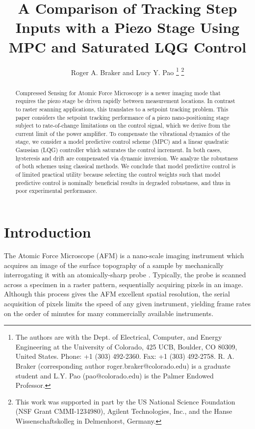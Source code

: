\documentclass[twocolumn,twoside]{IEEEtran}
\begin{document}
\title{A Comparison of Tracking Step Inputs with a Piezo Stage Using MPC and Saturated LQG Control}
\author{Roger A. Braker and Lucy Y. Pao
  \thanks{The authors are with the Dept. of Electrical, Computer, and Energy Engineering at the University of Colorado, 425 UCB, Boulder, CO 80309, United States. Phone: +1 (303) 492-2360. Fax: +1 (303) 492-2758.
    R. A.  Braker (corresponding author roger.braker@colorado.edu) is a graduate student and
    L.Y. Pao (pao@colorado.edu) is the Palmer Endowed Professor.}
  \thanks{This work was supported in part by the US National Science Foundation (NSF Grant CMMI-1234980), Agilent Technologies, Inc., and the Hanse Wissenschaftskolleg in Delmenhorst, Germany.}
}

\maketitle
\begin{abstract}
  Compressed Sensing for Atomic Force Microscopy is a newer imaging mode that requires the piezo stage be driven rapidly between measurement locations. In contrast to raster scanning applications, this translates to a setpoint tracking problem. 
  This paper considers the setpoint tracking performance of a piezo nano-positioning stage subject to rate-of-change limitations on the control signal, which we derive from the current limit of the power amplifier.
To compensate the vibrational dynamics of the stage, we consider a model predictive control scheme (MPC) and a linear quadratic Gaussian (LQG) controller which saturates the control increment. In both cases, hysteresis and drift are compensated via dynamic inversion. We analyze the robustness of both schemes using classical methods. We conclude that model predictive control is of limited practical utility because selecting the control weights such that model predictive control is nominally beneficial results in degraded robustness, and thus in poor experimental performance.
\end{abstract}


\section{Introduction}\label{sec:intro}
The Atomic Force Microscope (AFM) is a nano-scale imaging instrument which acquires an image of the surface topography of a sample by mechanically interrogating it with an atomically-sharp probe \cite{abramovitch_tutorial_2007, rana_improvement_survey_2017}. Typically, the probe is scanned across a specimen in a raster pattern, sequentially acquiring pixels in an image. Although this process gives the AFM excellent spatial resolution, the serial acquisition of pixels limits the speed of any given instrument, yielding frame rates on the order of minutes for many commercially available instruments.
\end{document}
